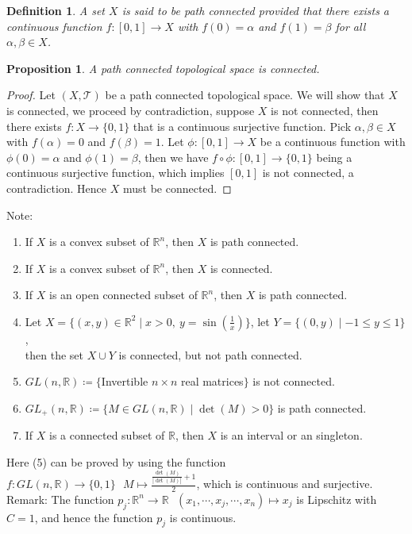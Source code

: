 \documentclass[15pt]{book}
\theoremstyle{break}
\theoremstyle{break}
\newtheorem{prop}[lem]{Proposition}
\newtheorem{defn}{Definition}[corL]
\newcommand{\R}{\mathbb{R}}
\newcommand{\T}{\mathcal{T}}
\newcommand{\note}{\color{red}Note: \color{black}}
\newcommand{\remark}{\color{blue}Remark: \color{black}}
\begin{document}
\begin{defn}
A set $X$ is said to be path connected provided that there exists a continuous function $f:[0,1] \to X$ with $f(0) = \alpha$ and $f(1) = \beta$ for all $\alpha,\beta \in X$.
\end{defn}

\begin{prop}
A path connected topological space is connected.
\end{prop}
\begin{proof}
Let $(X,\T)$ be a path connected topological space. We will show that $X$ is connected, we proceed by contradiction, suppose $X$ is not connected, then there exists $f:X \to \{0,1\}$ that is a continuous surjective function. Pick $\alpha,\beta \in X$ with $f(\alpha) = 0$ and $f(\beta) = 1$. Let $\phi:[0,1] \to X$ be a continuous function with $\phi(0) = \alpha$ and $\phi(1) = \beta$, then we have $f\circ \phi :[0,1] \to \{0,1\}$ being a continuous surjective function, which implies $[0,1]$ is not connected, a contradiction. Hence $X$ must be connected.
\end{proof}
\newpage

\note \begin{enumerate}[topsep=3pt,itemsep=-1ex,partopsep=1ex,parsep=1ex]
\item If $X$ is a convex subset of $\R^n$, then $X$ is path connected.
\item If $X$ is a convex subset of $\R^n$, then $X$ is connected.
\item If $X$ is an open connected subset of $\R^n$, then $X$ is path connected.
\item Let $X=\{(x,y) \in \R^2 \mid x>0,\ y=\sin(\frac{1}{x})\}$, let $Y=\{(0,y)\mid -1\leq y \leq 1\}$,\\ then the set $X\cup Y$ is connected, but not path connected.
\item $GL(n,\R)\coloneqq \{$Invertible $n\times n$ real matrices$\}$ is not connected.
\item $GL_{+}(n,\R)\coloneqq \{ M \in GL(n,\R) \mid \det(M)>0\}$ is path connected.
\item If $X$ is a connected subset of $\R$, then $X$ is an interval or an singleton.
\end{enumerate}
Here (5) can be proved by using the function $f: GL(n,\R) \to \{0,1\} \ \ \ M \mapsto \frac{\frac{\det(M)}{|\det(M)|}+1}{2}$, which is continuous and surjective.\\

\remark The function $p_j : \R^n \to \R \ \ \ (x_1,\cdots,x_j,\cdots, x_n)\mapsto x_j$ is Lipschitz with $C=1$, and hence the function $p_j$ is continuous. \\
\end{document}
